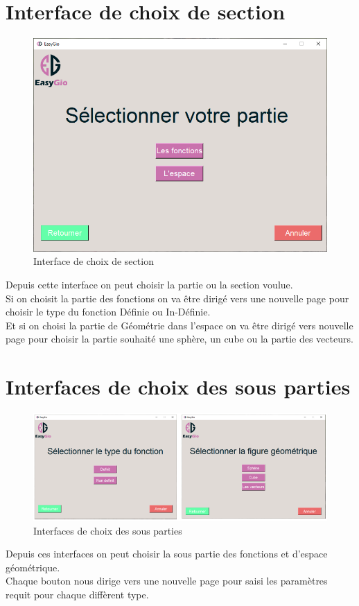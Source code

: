 \documentclass[a4paper]{report}
\begin{document}
\section{Interface de choix de section}
\begin{figure}[!h]
    \centering
    \includegraphics[width=12cm]{images/Interface2.PNG}
    \caption{Interface de choix de section}
    \label{fig:Interface de choix de section}
\end{figure}
Depuis cette interface on peut choisir la partie ou la section voulue.\\
Si on choisit la partie des fonctions on va être dirigé vers une nouvelle page pour choisir le type du fonction Définie ou In-Définie.\\
Et si on choisi la partie de Géométrie dans l'espace on va être dirigé vers nouvelle page pour choisir la partie souhaité une sphère, un cube ou la partie des vecteurs.
\section{Interfaces de choix des sous parties}
\begin{figure}[!h]
    \centering
    \includegraphics[width=15cm]{images/TypesCaptures.PNG}
    \caption{Interfaces de choix des sous parties}
    \label{fig:Interfaces de choix des sous parties}
\end{figure}
Depuis ces interfaces on peut choisir la sous partie des fonctions et d'espace géométrique.\\
Chaque bouton nous dirige vers une nouvelle page pour saisi les paramètres requit pour chaque diffèrent type.
\newpage
\end{document}
